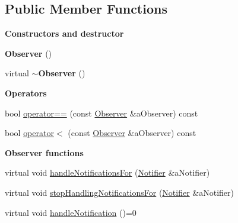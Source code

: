 \subsection*{Public Member Functions}
\begin{Indent}{\bf Constructors and destructor}\par
\begin{DoxyCompactItemize}
\item 
{\bfseries Observer} ()\hypertarget{class_base_1_1_observer_a0b8f55248bb0b393ed760d50b7f58d21}{}\label{class_base_1_1_observer_a0b8f55248bb0b393ed760d50b7f58d21}

\item 
virtual {\bfseries $\sim$\+Observer} ()\hypertarget{class_base_1_1_observer_aca7a3c17bdc9d86a9f67519779baf2e9}{}\label{class_base_1_1_observer_aca7a3c17bdc9d86a9f67519779baf2e9}

\end{DoxyCompactItemize}
\end{Indent}
\begin{Indent}{\bf Operators}\par
\begin{DoxyCompactItemize}
\item 
bool \hyperlink{class_base_1_1_observer_aca74f78fc397401d5e90cd85193bd84c}{operator==} (const \hyperlink{class_base_1_1_observer}{Observer} \&a\+Observer) const 
\item 
bool \hyperlink{class_base_1_1_observer_aeabd57c2929d345f45132d4c0c1c6c58}{operator$<$} (const \hyperlink{class_base_1_1_observer}{Observer} \&a\+Observer) const 
\end{DoxyCompactItemize}
\end{Indent}
\begin{Indent}{\bf Observer functions}\par
\begin{DoxyCompactItemize}
\item 
virtual void \hyperlink{class_base_1_1_observer_a805cc1ddc6526d692af81d76ae29d802}{handle\+Notifications\+For} (\hyperlink{class_base_1_1_notifier}{Notifier} \&a\+Notifier)
\item 
virtual void \hyperlink{class_base_1_1_observer_a0646f881f6716ab7be41ecefa74b5071}{stop\+Handling\+Notifications\+For} (\hyperlink{class_base_1_1_notifier}{Notifier} \&a\+Notifier)
\item 
virtual void \hyperlink{class_base_1_1_observer_a37d00a5290a60aa9ab664af5d1642c3e}{handle\+Notification} ()=0
\end{DoxyCompactItemize}
\end{Indent}
